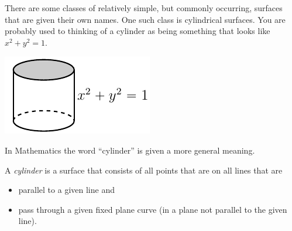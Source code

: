 There are some classes of relatively simple, but commonly occurring, 
surfaces that are given their own names. One such class is cylindrical surfaces.
You are probably used to thinking of a cylinder as being something that looks 
like $x^2+y^2=1$. 
\begin{efig}
\begin{center}
   \includegraphics{cylinderA.pdf}
\end{center}
\end{efig}
In Mathematics the word ``cylinder'' is given a more general meaning.

\begin{defn}[Cylinder]\label{def cylinder}
A \emph{cylinder} is a surface that consists of all points that are 
on all lines that are
\begin{itemize}\itemsep1pt \parskip0pt 
\item   parallel to a given line and
\item   pass through a given fixed plane curve (in a plane not parallel
to the given line).
\end{itemize}
\end{defn}

